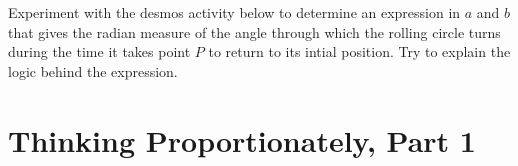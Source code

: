 \documentclass{ximera}
\begin{document}
\begin{exploration}\label{exp:angles2}
Experiment with the desmos activity below to determine an expression in $a$ and $b$ that gives the radian measure of the angle through which the rolling circle turns during the time it takes point $P$ to return to its intial position. Try to explain the logic behind the expression.


 
\begin{onlineOnly}
    \begin{center}
\end{center}
\end{onlineOnly}
\end{exploration}


\section{Thinking Proportionately, Part 1}
\end{document}
